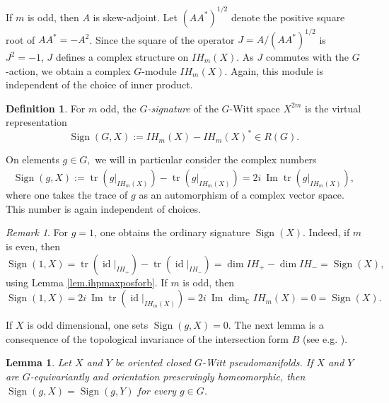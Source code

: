 \documentclass{amsart}
\newtheorem{lemma}[thm]{Lemma}
\theoremstyle{definition}
\newtheorem{defn}[thm]{Definition}
\theoremstyle{remark}
\newtheorem{remark}[thm]{Remark}
\newcommand {\cplx}  {\ensuremath{\mathbb{C}}}
\newcommand {\id}    {\ensuremath{\operatorname{id}}}
\newcommand {\Sign}    {{\ensuremath{\operatorname{Sign}}}}
\newcommand {\tr}    {{\ensuremath{\operatorname{tr}}}}
\begin{document}
If $m$ is odd, then $A$ is skew-adjoint.
Let $(AA^*)^{1/2}$ denote the positive square root of $AA^* = -A^2$.
Since the square of the operator $J = A/ (AA^*)^{1/2}$ 
is $J^2 = -1$, $J$ defines a complex structure on $IH_m (X)$.
As $J$ commutes with the $G$-action, we obtain a complex $G$-module $IH_m (X)$.
Again, this module is independent of the choice of inner product.

\begin{defn}
For $m$ odd, the \emph{$G$-signature} of the 
$G$-Witt space $X^{2m}$ is the virtual representation
\[ \Sign (G,X) := IH_m (X) - IH_m (X)^* \in R(G).  \]
\end{defn}
\noindent On elements $g\in G,$ we will in particular consider the complex numbers
\[  \Sign (g,X) := \tr (g|_{IH_m (X)}) - \overline{\tr (g|_{IH_m (X)})} 
  = 2i~ \operatorname{Im} \tr(g|_{IH_m (X)}), \]
where one takes the trace of $g$ as an automorphism of a 
complex vector space.
This number is again independent of choices.

\begin{remark} \label{rem.gsignforgequalone}
For $g=1$, one obtains the ordinary signature $\Sign (X)$.
Indeed, if $m$ is even, then
\[ \Sign (1,X)
    = \tr(\id|_{IH_+}) - \tr(\id|_{IH_-})
    = \dim IH_+ - \dim IH_-
    = \Sign (X), \]
using Lemma \ref{lem.ihpmaxposforb}.    
If $m$ is odd, then
\[ \Sign (1,X)
    = 2i~ \operatorname{Im} \tr(\id|_{IH_m (X)})
    = 2i~ \operatorname{Im} \dim_\cplx IH_m (X)
    = 0 = \Sign (X). \]
\end{remark}
If $X$ is odd dimensional, one sets $\Sign (g,X)=0$.
The next lemma is a consequence of the topological invariance of
the intersection form $B$ 
(see e.g. \cite[Remark 8.2.7 and Thm. 9.3.16]{friedmanihbook}).
\begin{lemma} \label{lem.gsignpresequivhomeo}
Let $X$ and $Y$ be oriented closed $G$-Witt pseudomanifolds.  
If $X$ and $Y$ are $G$-equivariantly and orientation preservingly
homeomorphic, then
$\Sign (g,X) = \Sign (g,Y)$ for every $g\in G$.
\end{lemma}
\end{document}
